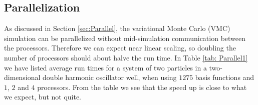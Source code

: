 \documentclass[../main.tex]{subfiles}
\begin{document}

\subsection{Parallelization}

As discussed in Section \ref{sec:Parallel}, the variational Monte Carlo (VMC) simulation can be parallelized without mid-simulation communication between the processors. Therefore we can expect near linear scaling, so doubling the number of processors should about halve the run time. In Table \ref{tab: Parallel1} we have listed average run times for a system of two particles in a two-dimensional double harmonic oscillator well, when using $1275$ basis functions and $1$, $2$ and $4$ processors. From the table we see that the speed up is close to what we expect, but not quite. 
\end{document}

